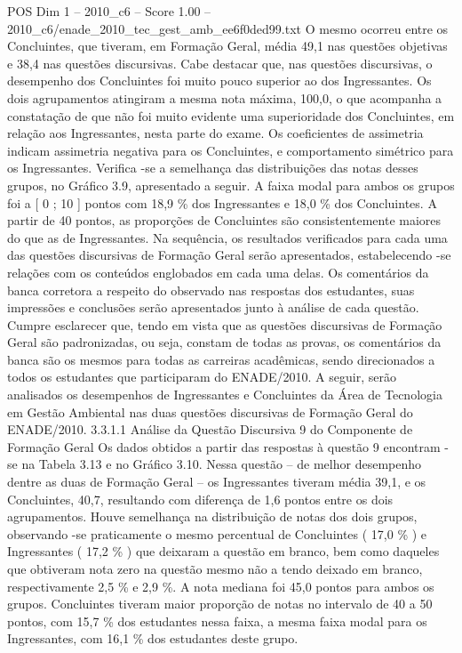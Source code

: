 \begin{textsample}{POS Dim 1 – 2010\_c6 – Score 1.00 – 2010\_c6/enade\_2010\_tec\_gest\_amb\_ee6f0ded99.txt}
O mesmo ocorreu entre os Concluintes, que tiveram, em Formação Geral, média 49,1 nas questões objetivas e 38,4 nas questões discursivas.
Cabe destacar que, nas questões discursivas, o desempenho dos Concluintes foi muito pouco superior ao dos Ingressantes.
Os dois agrupamentos atingiram a mesma nota máxima, 100,0, o que acompanha a constatação de que não foi muito evidente uma superioridade dos Concluintes, em relação aos Ingressantes, nesta parte do exame.
Os coeficientes de assimetria indicam assimetria negativa para os Concluintes, e comportamento simétrico para os Ingressantes.
Verifica -se a semelhança das distribuições das notas desses grupos, no Gráfico 3.9, apresentado a seguir.
A faixa modal para ambos os grupos foi a [ 0 ; 10 ] pontos com 18,9 \% dos Ingressantes e 18,0 \% dos Concluintes.
A partir de 40 pontos, as proporções de Concluintes são consistentemente maiores do que as de Ingressantes.
Na sequência, os resultados verificados para cada uma das questões discursivas de Formação Geral serão apresentados, estabelecendo -se relações com os conteúdos englobados em cada uma delas.
Os comentários da banca corretora a respeito do observado nas respostas dos estudantes, suas impressões e conclusões serão apresentados junto à análise de cada questão.
Cumpre esclarecer que, tendo em vista que as questões discursivas de Formação Geral são padronizadas, ou seja, constam de todas as provas, os comentários da banca são os mesmos para todas as carreiras acadêmicas, sendo direcionados a todos os estudantes que participaram do ENADE/2010.
A seguir, serão analisados os desempenhos de Ingressantes e Concluintes da Área de Tecnologia em Gestão Ambiental nas duas questões discursivas de Formação Geral do ENADE/2010. 3.3.1.1 Análise da Questão Discursiva 9 do Componente de Formação Geral Os dados obtidos a partir das respostas à questão 9 encontram -se na Tabela 3.13 e no Gráfico 3.10.
Nessa questão – de melhor desempenho dentre as duas de Formação Geral – os Ingressantes tiveram média 39,1, e os Concluintes, 40,7, resultando com diferença de 1,6 pontos entre os dois agrupamentos.
Houve semelhança na distribuição de notas dos dois grupos, observando -se praticamente o mesmo percentual de Concluintes ( 17,0 \% ) e Ingressantes ( 17,2 \% ) que deixaram a questão em branco, bem como daqueles que obtiveram nota zero na questão mesmo não a tendo deixado em branco, respectivamente 2,5 \% e 2,9 \%.
A nota mediana foi 45,0 pontos para ambos os grupos.
Concluintes tiveram maior proporção de notas no intervalo de 40 a 50 pontos, com 15,7 \% dos estudantes nessa faixa, a mesma faixa modal para os Ingressantes, com 16,1 \% dos estudantes deste grupo.

\end{textsample}
